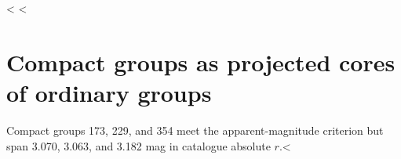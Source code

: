 \documentclass{aa}
\begin{document}
\begin{appendix}
\FloatBarrier

<%
<%
\section{Compact groups as projected cores of ordinary groups}\label{app:cg_core_overlap}

Compact groups 173, 229, and 354 meet the apparent-magnitude criterion but span 3.070, 3.063, and 3.182 mag in catalogue absolute $r$.<%


\end{appendix}
\end{document}
